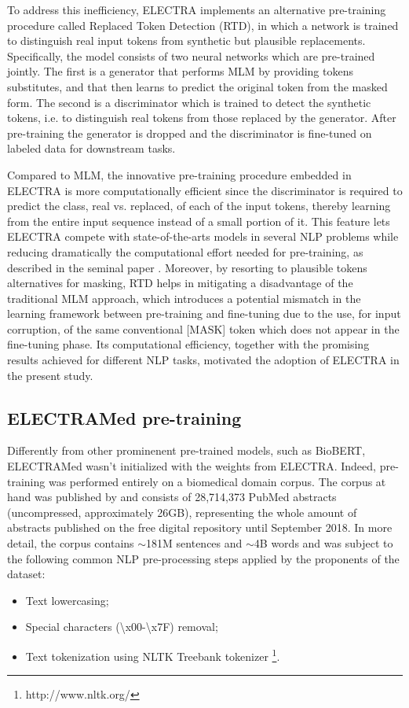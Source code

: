 \documentclass{article}
\begin{document}
To address this inefficiency, ELECTRA implements an alternative pre-training procedure called Replaced Token Detection (RTD), in which a network is trained to distinguish real input tokens from synthetic but plausible replacements.
Specifically, the model consists of two neural networks which are pre-trained jointly. 
The first is a generator that performs MLM by providing tokens substitutes, and that then learns to predict the original token from the masked form. The second is a discriminator which is trained to detect the synthetic tokens, i.e. to distinguish real tokens from those replaced by the generator.
After pre-training the generator is dropped and the discriminator is fine-tuned on labeled data for downstream tasks.

Compared to MLM, the innovative pre-training procedure embedded in ELECTRA is more computationally efficient since the discriminator is required to predict the class, real vs. replaced, of each of the input tokens, thereby learning from the entire input sequence instead of a small portion of it.
This feature lets ELECTRA compete with state-of-the-arts models in several NLP problems while reducing dramatically the computational effort needed for pre-training, as described in the seminal paper \citep{Clark20}. Moreover, by resorting to plausible tokens alternatives for masking, RTD helps in mitigating a disadvantage of the traditional MLM approach, which introduces a potential mismatch in the learning framework between pre-training and fine-tuning due to the use, for input corruption, of the same conventional [MASK] token which does not appear in the fine-tuning phase.
Its computational efficiency, together with the promising results achieved for different NLP tasks, motivated the adoption of ELECTRA in the present study.

\subsection{ELECTRAMed pre-training}
Differently from other prominenent pre-trained models, such as BioBERT, ELECTRAMed wasn't initialized with the weights from ELECTRA.
Indeed, pre-training was performed entirely on a biomedical domain corpus.
The corpus at hand was published by \citep{Peng19} and consists of 28,714,373 PubMed abstracts (uncompressed, approximately 26GB), representing the whole amount of abstracts published on the free digital repository until September 2018.
In more detail, the corpus contains $\sim$181M sentences and $\sim$4B words and was subject to the following common NLP pre-processing steps applied by the  proponents of the dataset:
\begin{itemize}
    \item Text lowercasing;
    \item Special characters (\textbackslash x00-\textbackslash x7F) removal;
    \item Text tokenization using NLTK Treebank tokenizer \footnote{http://www.nltk.org/}.
\end{itemize}
\end{document}
